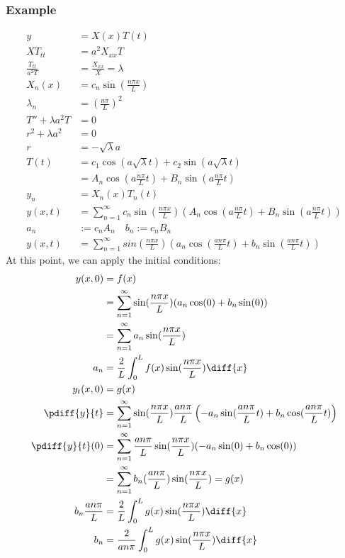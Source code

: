 \documentclass{math}
\begin{document}
\subsubsection*{Example}
\begin{align*}
  y &= X(x)T(t) \\
  XT_{tt} &= a^2X_{xx}T \\
  \frac{T_{tt}}{a^2T} &= \frac{X_{xx}}{X} = \lambda \\
  X_n(x) &= c_n\sin(\frac{n\pi x}{L}) \\
  \lambda_n &= \left(\frac{n\pi}{L}\right)^2 \\
  T''+\lambda a^2T &= 0 \\
  r^2+\lambda a^2 &= 0 \\
  r &= -\sqrt{\lambda}a \\
  T(t) &= c_1\cos(a\sqrt{\lambda}t)+c_2\sin(a\sqrt{\lambda}t) \\
  &= A_n\cos(a\frac{n\pi}{L}t)+B_n\sin(a\frac{n\pi}{L}t) \\
  y_n &= X_n(x)T_n(t) \\
  y(x,t) &= \sum_{n=1}^{\infty}c_n\sin(\frac{n\pi x}{L})
    (A_n\cos(a\frac{n\pi}{L}t)+B_n\sin(a\frac{n\pi}{L}t)) \\
  a_n &:= c_nA_n \quad b_n := c_nB_n \\
  y(x,t) &= \sum_{n=1}^{\infty}
  sin(\frac{n\pi x}{L})(a_n\cos(\frac{an\pi}{L}t)+b_n\sin(\frac{an\pi}{L}t))
\end{align*}
At this point, we can apply the initial conditions:
\begin{align*}
  y(x,0) &= f(x) \\
  &= \sum_{n=1}^{\infty}\sin(\frac{n\pi x}{L})(a_n\cos(0)+b_n\sin(0)) \\
  &= \sum_{n=1}^{\infty}a_n\sin(\frac{n\pi x}{L}) \\
  a_n &= \frac{2}{L}\int_{0}^{L}f(x)\sin(\frac{n\pi x}{L})\diff{x} \\
  y_t(x,0) &= g(x) \\
  \pdiff{y}{t} &= \sum_{n=1}^{\infty}\sin(\frac{n\pi x}{L})\frac{an\pi}{L}
    \left(-a_n\sin(\frac{an\pi}{L}t)+b_n\cos(\frac{an\pi}{L}t)\right) \\
  \pdiff{y}{t}(0) &= \sum_{n=1}^{\infty}\frac{an\pi}{L}\sin(\frac{n\pi x}{L})
    (-a_n\sin(0)+b_n\cos(0)) \\
  &= \sum_{n=1}^{\infty}b_n(\frac{an\pi}{L})\sin(\frac{n\pi x}{L}) = g(x) \\
  b_n\frac{an\pi}{L} &=
    \frac{2}{L}\int_{0}^{L}g(x)\sin(\frac{n\pi x}{L})\diff{x} \\
  b_n &= \frac{2}{an\pi}\int_{0}^{L}g(x)\sin(\frac{n\pi x}{L})\diff{x}
\end{align*}
\end{document}
